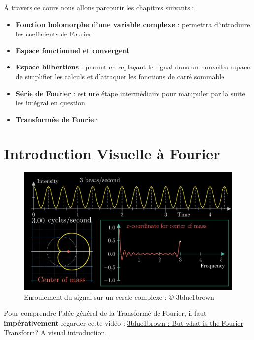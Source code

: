 \documentclass[a4paper]{book}
\begin{document}
À travers ce cours nous allons parcourir les chapitres suivants :
\begin{itemize}
	\item \textbf{Fonction holomorphe d'une variable complexe} : permettra
		d'introduire les coefficients de Fourier
	\item \textbf{Espace fonctionnel et convergent}
	\item \textbf{Espace hilbertiens} : permet en replaçant le signal dans
		un nouvelles espace de simplifier les calculs et d'attaquer les
		fonctions de carré sommable
	\item \textbf{Série de Fourier} : est  une étape intermédiaire pour
		manipuler par la suite les intégral en question
	\item \textbf{Transformée de Fourier}
\end{itemize}

\chapter{Introduction Visuelle à Fourier}

\begin{figure}[h]
	\centering
	\includegraphics[scale=0.2]{visu_fourier.jpg}
	\caption{Enroulement du signal sur un cercle
	complexe : © 3blue1brown }
\end{figure}



Pour comprendre l'idée général de la Transformé de Fourier, il faut
\textbf{impérativement} regarder cette vidéo : 
\href{https://www.youtube.com/watch?v=spUNpyF58BY}{3blue1brown : But 
what is the Fourier Transform? A visual introduction.}
\end{document}

